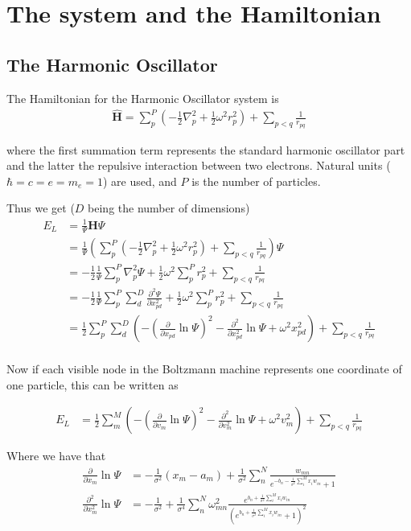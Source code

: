 \documentclass[norsk,a4paper,11pt]{article}
\begin{document}
\section{The system and the Hamiltonian}
\subsection{The Harmonic Oscillator}
The Hamiltonian for the Harmonic Oscillator system is \cite{lectures2015}
\begin{align}
	\hat{\mathbf{H}} = \sum_p^P (-\frac{1}{2}\nabla_p^2 + \frac{1}{2}\omega^2 r_p^2 ) + \sum_{p<q} \frac{1}{r_{pq}}
\end{align}

where the first summation term represents the standard harmonic oscillator part and the latter the repulsive interaction between two electrons. Natural units ($\hbar=c=e=m_e=1$) are used, and $P$ is the number of particles.

Thus we get ($D$ being the number of dimensions)
\begin{align}
	E_L &= \frac{1}{\Psi} \mathbf{H} \Psi \\
	&= \frac{1}{\Psi} (\sum_p^P (-\frac{1}{2}\nabla_p^2 + \frac{1}{2}\omega^2 r_p^2 ) + \sum_{p<q} \frac{1}{r_{pq}}) \Psi \\
	&= -\frac{1}{2}\frac{1}{\Psi} \sum_p^P \nabla_p^2 \Psi 
	+ \frac{1}{2}\omega^2 \sum_p^P  r_p^2  + \sum_{p<q} \frac{1}{r_{pq}} \\
	&= -\frac{1}{2}\frac{1}{\Psi} \sum_p^P \sum_d^D \frac{\partial^2 \Psi}{\partial x_{pd}^2} + \frac{1}{2}\omega^2 \sum_p^P  r_p^2  + \sum_{p<q} \frac{1}{r_{pq}} \\
	&= \frac{1}{2} \sum_p^P \sum_d^D (-(\frac{\partial}{\partial x_{pd}} \ln\Psi)^2 -\frac{\partial^2}{\partial x_{pd}^2} \ln\Psi + \omega^2 x_{pd}^2)  + \sum_{p<q} \frac{1}{r_{pq}} \\
\end{align}

Now if each visible node in the Boltzmann machine represents one coordinate of one particle, this can be written as

\begin{align}
	E_L &=
	\frac{1}{2} \sum_m^M (-(\frac{\partial}{\partial v_m} \ln\Psi)^2 -\frac{\partial^2}{\partial v_m^2} \ln\Psi + \omega^2 v_m^2)  + \sum_{p<q} \frac{1}{r_{pq}}
\end{align}

Where we have that
\begin{align}
	\frac{\partial}{\partial x_m} \ln\Psi
	&= - \frac{1}{\sigma^2}(x_m - a_m) + \frac{1}{\sigma^2} \sum_n^N \frac{w_{mn}}{e^{-b_n - \frac{1}{\sigma^2}\sum_i^M x_i w_{in}} + 1} \\
	\frac{\partial^2}{\partial x_m^2} \ln\Psi
	&= - \frac{1}{\sigma^2} + \frac{1}{\sigma^4}\sum_n^N \omega_{mn}^2 \frac{e^{b_n + \frac{1}{\sigma^2}\sum_i^M x_i w_{in}}}{(e^{b_n + \frac{1}{\sigma^2}\sum_i^M x_i w_{in}} + 1)^2}
\end{align}
\end{document}

